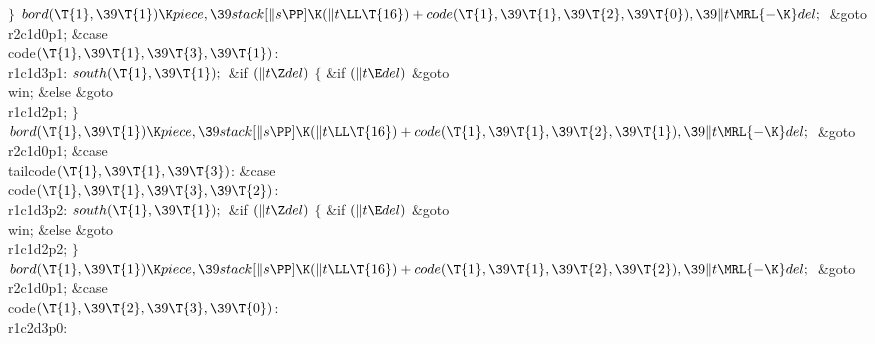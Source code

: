 \2${}\}{}$\2\6
${}\\{bord}(\T{1},\39\T{1})\K\\{piece},\39\\{stack}[\|s\PP]\K(\|t\LL\T{16})+%
\\{code}(\T{1},\39\T{1},\39\T{2},\39\T{0}),\39\|t\MRL{-{\K}}\\{del};{}$\6
\&{goto} \\{r2c1d0p1};\6
\4\&{case} \\{code}${}(\T{1},\39\T{1},\39\T{3},\39\T{1}){}$:\5
\\{r1c1d3p1}:\5
${}\\{south}(\T{1},\39\T{1});{}$\6
\&{if} ${}(\|t\Z\\{del}){}$\5
${}\{{}$\5
\1\&{if} ${}(\|t\E\\{del}){}$\1\5
\&{goto} \\{win};\5
\2\&{else}\1\5
\&{goto} \\{r1c1d2p1};\5
\2${}\}{}$\2\6
${}\\{bord}(\T{1},\39\T{1})\K\\{piece},\39\\{stack}[\|s\PP]\K(\|t\LL\T{16})+%
\\{code}(\T{1},\39\T{1},\39\T{2},\39\T{1}),\39\|t\MRL{-{\K}}\\{del};{}$\6
\&{goto} \\{r2c1d0p1};\6
\4\&{case} \\{tailcode}${}(\T{1},\39\T{1},\39\T{3}){}$:\5
\&{case} \\{code}${}(\T{1},\39\T{1},\39\T{3},\39\T{2}){}$:\5
\\{r1c1d3p2}:\5
${}\\{south}(\T{1},\39\T{1});{}$\6
\&{if} ${}(\|t\Z\\{del}){}$\5
${}\{{}$\5
\1\&{if} ${}(\|t\E\\{del}){}$\1\5
\&{goto} \\{win};\5
\2\&{else}\1\5
\&{goto} \\{r1c1d2p2};\5
\2${}\}{}$\2\6
${}\\{bord}(\T{1},\39\T{1})\K\\{piece},\39\\{stack}[\|s\PP]\K(\|t\LL\T{16})+%
\\{code}(\T{1},\39\T{1},\39\T{2},\39\T{2}),\39\|t\MRL{-{\K}}\\{del};{}$\6
\&{goto} \\{r2c1d0p1};\6
\4\&{case} \\{code}${}(\T{1},\39\T{2},\39\T{3},\39\T{0}){}$:\5
\\{r1c2d3p0}:\5
